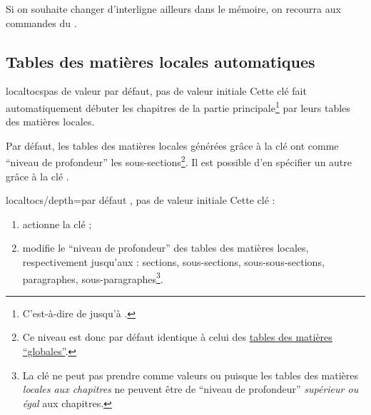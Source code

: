 Si on souhaite changer d'interligne ailleurs dans le mémoire, on recourra aux
commandes du  .

\subsection{Tables des matières locales automatiques}
\label{sec-localtoc}%
%

%
%

\begin{docKey}[][doc new=2016-10-30]{localtocs}{}{pas de valeur par défaut, pas
    de valeur initiale}
  Cette clé fait automatiquement débuter les chapitres de la partie
  principale\footnote{C'est-à-dire de  jusqu'à
    .} par leurs tables des matières locales.
\end{docKey}

Par défaut, les tables des matières locales générées grâce à la clé
 ont comme \enquote{niveau de profondeur} les
sous-sections\footnote{Ce niveau est donc par défaut identique à celui des
  \hyperref[sec-table-des-matieres]{tables des matières
    \enquote{globales}}.}. Il est possible d'en spécifier un autre grâce à la
clé .

{%
  \begin{docKey}[][doc
    new=2016-10-30]{localtocs/depth}{=\textbar{}\textbar{}\textbar{}\textbar{}}{par
      défaut , pas de valeur initiale}
    Cette clé :
    \begin{enumerate}
    \item actionne la clé  ;
    \item modifie le \enquote{niveau de profondeur} des tables des matières
      locales, respectivement jusqu'aux : sections, sous-sections,
      sous-sous-sections, paragraphes, sous-paragraphes\footnote{La clé
         ne peut pas prendre comme valeurs
         ou  puisque les tables des matières
        \emph{locales aux chapitres} ne peuvent être de \enquote{niveau de
          profondeur} \emph{supérieur ou égal} aux chapitres.}.
    \end{enumerate}

\end{docKey}
}

